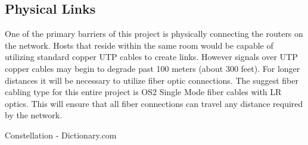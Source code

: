 \documentclass[12pt]{article}
\begin{document}
\subsection{Physical Links}

One of the primary barriers of this project is physically connecting the routers on the network. Hosts that reside within the same room would be capable
of utilizing standard copper UTP cables to create links. However signals over UTP copper cables may begin to degrade past 100 meters (about 300 feet). 
For longer distances it will be necessary to utilize fiber optic connections. The suggest fiber cabling type for this entire project is OS2 Single Mode
fiber cables with LR optics. This will ensure that all fiber connections can travel any distance required by the network. 


\begin{thebibliography}{10}
Constellation - Dictionary.com


\end{thebibliography}
\end{document}
